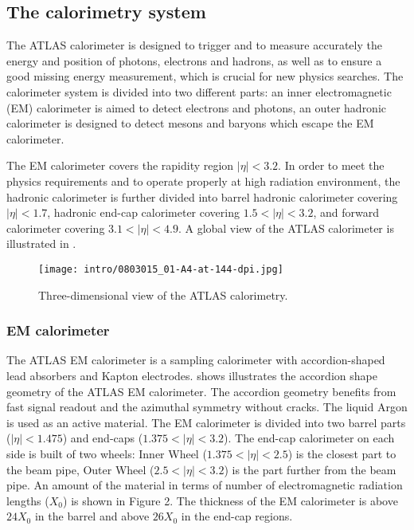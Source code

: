 \subsection{The calorimetry system}

The ATLAS calorimeter is designed to trigger and to measure accurately the energy and position of photons, electrons and hadrons, as well as to ensure a good missing energy measurement, which is crucial for new physics searches. The calorimeter system is divided into two different parts: an inner electromagnetic (EM) calorimeter is aimed to detect electrons and photons, an outer hadronic calorimeter is designed to detect mesons and baryons which escape the EM calorimeter.

The EM calorimeter covers the rapidity region $|\eta| < 3.2$.
In order to meet the physics requirements and to operate properly at high radiation environment, the hadronic calorimeter is further divided into barrel hadronic calorimeter covering $|\eta| < 1.7$, hadronic end-cap calorimeter covering $1.5 < |\eta| < 3.2$, and forward calorimeter covering $3.1 < |\eta| < 4.9$. A global view of the ATLAS calorimeter is illustrated in .

\begin{figure}[h!]
\centering
 \texttt{[image: intro/0803015\_01-A4-at-144-dpi.jpg]}
 \caption{ Three-dimensional view of the ATLAS calorimetry.}
\label{fig:Calo}
\end{figure}

\subsubsection{EM calorimeter}
The ATLAS EM calorimeter is a sampling calorimeter with accordion-shaped lead absorbers and Kapton electrodes.
 shows illustrates the accordion shape geometry of the ATLAS EM calorimeter. The accordion geometry benefits from fast signal readout and the azimuthal symmetry without cracks. The liquid Argon is used as an active material. The EM calorimeter is divided into two barrel parts ($|\eta|<1.475$) and end-caps ($1.375<|\eta|<3.2$).
The end-cap calorimeter on each side is built of two wheels: Inner Wheel ($1.375<|\eta|<2.5$) is the closest part to the beam pipe,
Outer Wheel ($2.5<|\eta|<3.2$) is the part further from the beam pipe.
An amount of the material in terms of number of electromagnetic radiation lengths ($X_0$) is shown in Figure 2.
The thickness of the EM calorimeter is above $24 X_0$ in the barrel and above $26 X_0$ in the end-cap regions.

